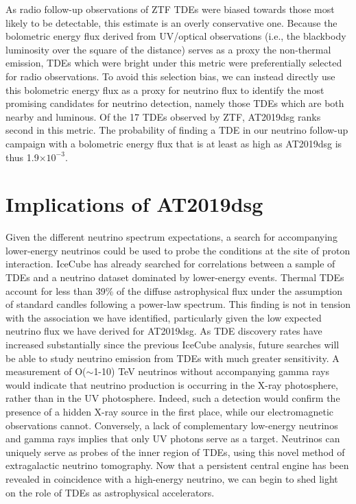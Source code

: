 As radio follow-up observations of ZTF TDEs were biased towards those most likely to be detectable, this estimate is an overly conservative one. Because the bolometric energy flux derived from UV/optical observations (i.e., the blackbody luminosity over the square of the distance) serves as a proxy the non-thermal emission, TDEs which were bright under this metric were preferentially selected for radio observations. To avoid this selection bias, we can instead directly use this bolometric energy flux  as a proxy for neutrino flux to identify the most promising candidates for neutrino detection, namely those TDEs which are both nearby and luminous. Of the 17 TDEs observed by ZTF, AT2019dsg ranks second in this metric. The probability of finding a TDE in our neutrino follow-up campaign with a bolometric energy flux that is at least as high as AT2019dsg is thus 1.9$ \times 10^{-3}$.

\section{Implications of AT2019dsg}

Given the different neutrino spectrum expectations, a search for accompanying lower-energy neutrinos could be used to probe the conditions at the site of proton interaction. IceCube has already searched for correlations between a sample of TDEs and a neutrino dataset dominated by lower-energy events\cite{2019ICRC...36.1016S}. Thermal TDEs account for less than 39\% of the diffuse astrophysical flux under the assumption of standard candles following a power-law spectrum. This finding is not in tension with the association we have identified, particularly given the low expected neutrino flux we have derived for AT2019dsg. As TDE discovery rates have increased substantially since the previous IceCube analysis\cite{2020arXiv200101409V, 2019ICRC...36.1016S}, future searches will be able to study neutrino emission from TDEs with much greater sensitivity. A measurement of O($\sim$1-10) TeV neutrinos without accompanying gamma rays would indicate that neutrino production is occurring in the X-ray photosphere, rather than in the UV photosphere. Indeed, such a detection would confirm the presence of a hidden X-ray source in the first place, while our electromagnetic observations cannot. Conversely, a lack of complementary low-energy neutrinos and gamma rays implies that only UV photons serve as a target. Neutrinos can uniquely serve as probes of the inner region of TDEs, using this novel method of extragalactic neutrino tomography. Now that a persistent central engine has been revealed in coincidence with a high-energy neutrino, we can begin to shed light on the role of TDEs as astrophysical accelerators.